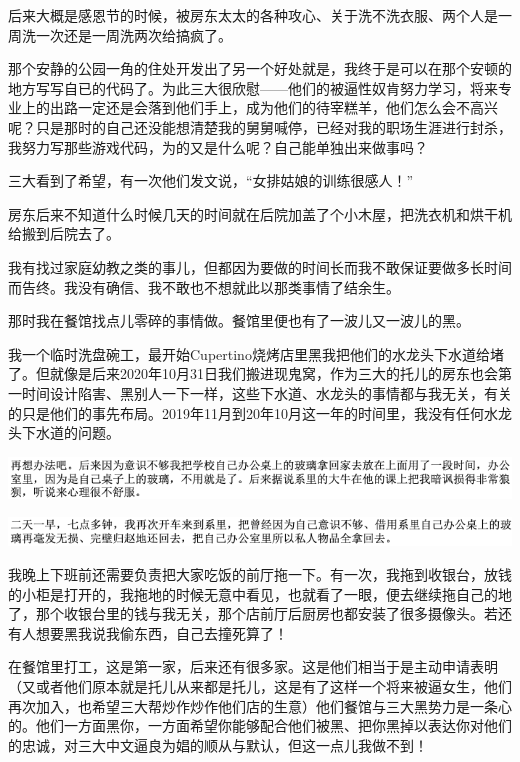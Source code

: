 \documentclass[9pt, b5paper]{article}
\begin{document}
后来大概是感恩节的时候，被房东太太的各种攻心、关于洗不洗衣服、两个人是一周洗一次还是一周洗两次给搞疯了。

那个安静的公园一角的住处开发出了另一个好处就是，我终于是可以在那个安顿的地方写写自已的代码了。为此三大很欣慰——他们的被逼性奴肯努力学习，将来专业上的出路一定还是会落到他们手上，成为他们的待宰糕羊，他们怎么会不高兴呢？只是那时的自己还没能想清楚我的舅舅喊停，已经对我的职场生涯进行封杀，我努力写那些游戏代码，为的又是什么呢？自己能单独出来做事吗？

三大看到了希望，有一次他们发文说，“女排姑娘的训练很感人！”

房东后来不知道什么时候几天的时间就在后院加盖了个小木屋，把洗衣机和烘干机给搬到后院去了。 

我有找过家庭幼教之类的事儿，但都因为要做的时间长而我不敢保证要做多长时间而告终。我没有确信、我不敢也不想就此以那类事情了结余生。

那时我在餐馆找点儿零碎的事情做。餐馆里便也有了一波儿又一波儿的黑。

我一个临时洗盘碗工，最开始Cupertino烧烤店里黑我把他们的水龙头下水道给堵了。但就像是后来2020年10月31日我们搬进现鬼窝，作为三大的托儿的房东也会第一时间设计陷害、黑别人一下一样，这些下水道、水龙头的事情都与我无关，有关的只是他们的事先布局。2019年11月到20年10月这一年的时间里，我没有任何水龙头下水道的问题。

\begin{center}
\includegraphics[width=.9\linewidth]{./pic/backups_plans_20210430_180120.png}
\end{center}

\begin{center}
\includegraphics[width=.9\linewidth]{./pic/backups_plans_20210430_180303.png}
\end{center}

我晚上下班前还需要负责把大家吃饭的前厅拖一下。有一次，我拖到收银台，放钱的小柜是打开的，我拖地的时候无意中看见，也就看了一眼，便去继续拖自己的地了，那个收银台里的钱与我无关，那个店前厅后厨房也都安装了很多摄像头。若还有人想要黑我说我偷东西，自己去撞死算了！

在餐馆里打工，这是第一家，后来还有很多家。这是他们相当于是主动申请表明（又或者他们原本就是托儿从来都是托儿，这是有了这样一个将来被逼女生，他们再次加入，也希望三大帮炒作炒作他们店的生意）他们餐馆与三大黑势力是一条心的。他们一方面黑你，一方面希望你能够配合他们被黑、把你黑掉以表达你对他们的忠诚，对三大中文逼良为娼的顺从与默认，但这一点儿我做不到！
\end{document}
